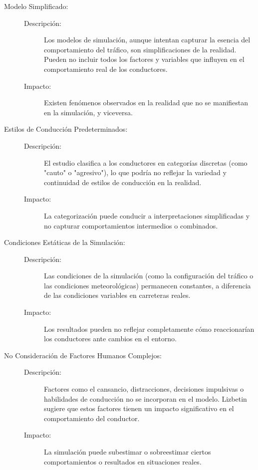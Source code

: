 \begin{description}
    \item[Modelo Simplificado:] \phantom{-}
    \begin{description}
        \item[Descripción:] Los modelos de simulación, aunque intentan capturar la esencia del comportamiento del tráfico, son simplificaciones de la realidad. Pueden no incluir todos los factores y variables que influyen en el comportamiento real de los conductores.
        \item[Impacto:] Existen fenómenos observados en la realidad que no se manifiestan en la simulación, y viceversa.
    \end{description}

    \item[Estilos de Conducción Predeterminados:] \phantom{-}
    \begin{description}
        \item[Descripción:] El estudio clasifica a los conductores en categorías discretas (como "cauto" o "agresivo"), lo que podría no reflejar la variedad y continuidad de estilos de conducción en la realidad.
        \item[Impacto:] La categorización puede conducir a interpretaciones simplificadas y no capturar comportamientos intermedios o combinados.
    \end{description}

    \item[Condiciones Estáticas de la Simulación:] \phantom{-}
    \begin{description}
        \item[Descripción:] Las condiciones de la simulación (como la configuración del tráfico o las condiciones meteorológicas) permanecen constantes, a diferencia de las condiciones variables en carreteras reales.
        \item[Impacto:] Los resultados pueden no reflejar completamente cómo reaccionarían los conductores ante cambios en el entorno.
    \end{description}

    \item[No Consideración de Factores Humanos Complejos:] \phantom{-}
    \begin{description}
        \item[Descripción:] Factores como el cansancio, distracciones, decisiones impulsivas o habilidades de conducción no se incorporan en el modelo. 
        Lizbetin \cite{lizbetin2017} sugiere que estos factores tienen un impacto significativo en el comportamiento del conductor.
        \item[Impacto:] La simulación puede subestimar o sobreestimar ciertos comportamientos o resultados en situaciones reales.
    \end{description}


\end{description}

